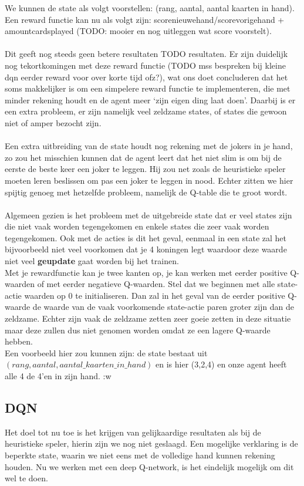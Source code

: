 \documentclass[11pt]{article}
\begin{document}
We kunnen de state als volgt voorstellen: (rang, aantal, aantal kaarten in hand). Een reward functie kan nu als volgt zijn: scorenieuwehand/scorevorigehand + amountcardsplayed (TODO: mooier en nog uitleggen wat score voorstelt).\\\\
Dit geeft nog steeds geen betere resultaten TODO resultaten. Er zijn duidelijk nog tekortkomingen met deze reward functie (TODO mss bespreken bij kleine dqn \- eerder reward voor over korte tijd ofz?), wat ons doet concluderen dat het soms makkelijker is om een simpelere reward functie te implementeren, die met minder rekening houdt en de agent meer `zijn eigen ding laat doen'. Daarbij is er een extra probleem, er zijn namelijk  veel zeldzame states, of states die gewoon niet of amper bezocht zijn. \\\\
Een extra uitbreiding van de state houdt nog rekening met de jokers in je hand, zo zou het misschien kunnen dat de agent leert dat het niet slim is om bij de eerste de beste keer een joker te leggen. Hij zou net zoals de heuristieke speler moeten leren beslissen om pas een joker te leggen in nood. Echter zitten we hier spijtig genoeg met hetzelfde probleem, namelijk de Q-table die te groot wordt.\\\\

Algemeen gezien is het probleem met de uitgebreide state dat er veel states zijn die niet vaak worden tegengekomen en enkele states die zeer vaak worden tegengekomen. Ook met de acties is dit het geval, eenmaal in een state zal het bijvoorbeeld niet veel voorkomen dat je 4 koningen legt waardoor deze waarde niet veel \textbf{geupdate} gaat worden bij het trainen. \\
Met je rewardfunctie kan je twee kanten op, je kan werken met eerder positive Q-waarden of met eerder negatieve Q-waarden. Stel dat we beginnen met alle state-actie waarden op 0 te initialiseren. Dan zal in het geval van de eerder positive Q-waarde de waarde van de vaak voorkomende state-actie paren groter zijn dan de zeldzame. Echter zijn vaak de zeldzame zetten zeer goeie zetten in deze situatie maar deze zullen dus niet genomen worden omdat ze een lagere Q-waarde hebben.\\
Een voorbeeld hier zou kunnen zijn: de state bestaat uit $(rang, aantal, aantal\_kaarten\_in\_hand)$ en is hier (3,2,4) en onze agent heeft alle 4 de 4'en in zijn hand. :w


\subsection{DQN}
Het doel tot nu toe is het krijgen van gelijkaardige resultaten als bij de heuristieke speler, hierin zijn we nog niet geslaagd. Een mogelijke verklaring is de beperkte state, waarin we niet eens met de volledige hand kunnen rekening houden. Nu we werken met een deep Q-network, is het eindelijk mogelijk om dit wel te doen.\\\\
\end{document}
